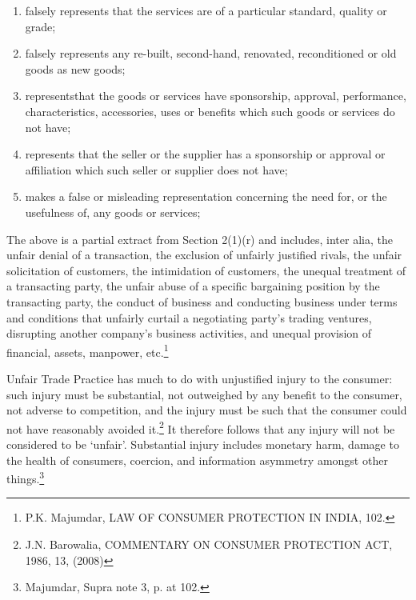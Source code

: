 \begin{multicols}{2}
{\begin{enumerate}[label=(\roman*)]
\item falsely represents that the services are of a particular standard, quality or grade;

\item falsely represents any re-built, second-hand, renovated, reconditioned or old goods as new goods;

\item representsthat the goods or services have sponsorship, approval, performance, characteristics,
accessories, uses or benefits which such goods or services do not have;

\item represents that the seller or the supplier has a sponsorship or approval or affiliation which such seller or
supplier does not have;

\item makes a false or misleading representation concerning the need for, or the usefulness of, any goods or services;
\end{enumerate}}


\noi
The above is a partial extract from Section 2(1)(r) and includes, inter alia, the unfair denial of
a transaction, the exclusion of unfairly justified rivals, the unfair solicitation of customers, the
intimidation of customers, the unequal treatment of a transacting party, the unfair abuse of a
specific bargaining position by the transacting party, the conduct of business and conducting
business under terms and conditions that unfairly curtail a negotiating party's trading ventures, disrupting another company's business activities, and unequal provision of financial, assets,
manpower, etc.\footnote{P.K. Majumdar, LAW OF CONSUMER PROTECTION IN INDIA, 102.}


\noi
Unfair Trade Practice has much to do with unjustified injury to the consumer: such injury must
be substantial, not outweighed by any benefit to the consumer, not adverse to competition, and
the injury must be such that the consumer could not have reasonably avoided it.\footnote{J.N. Barowalia, COMMENTARY ON CONSUMER PROTECTION ACT, 1986, 13, (2008)} It therefore follows that any injury will not be considered to be ‘unfair’. Substantial injury includes monetary harm, damage to the health of consumers, coercion, and information asymmetry amongst other things.\footnote{Majumdar, Supra note 3, p. at 102.}


\end{multicols}
